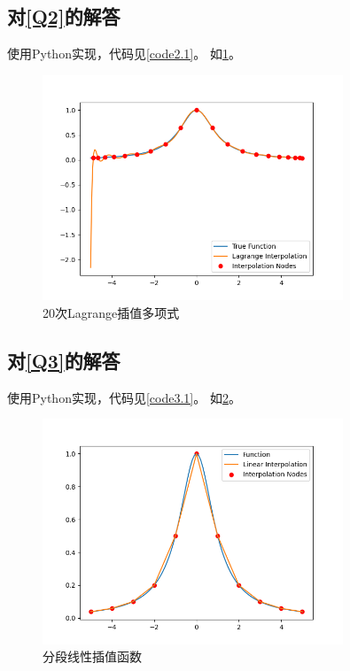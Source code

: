 \documentclass[a4paper,11pt,notitlepage]{article}
\begin{document}
\subsection{对\ref{Q2}的解答}
使用Python实现，代码见\cref{code2.1}。
如\cref{pic:2}。
\begin{figure}[H]
    \centering
    \includegraphics[width=0.8\textwidth]{../picture/Fourth_Week_1B.png}
    \caption{20次Lagrange插值多项式}
    \label{pic:2}
\end{figure}

\subsection{对\ref{Q3}的解答}
使用Python实现，代码见\cref{code3.1}。
如\cref{pic:3}。
\begin{figure}[H]
    \centering
    \includegraphics[width=0.8\textwidth]{../picture/Fourth_Week_1C.png}
    \caption{分段线性插值函数}
    \label{pic:3}
\end{figure}
\end{document}
